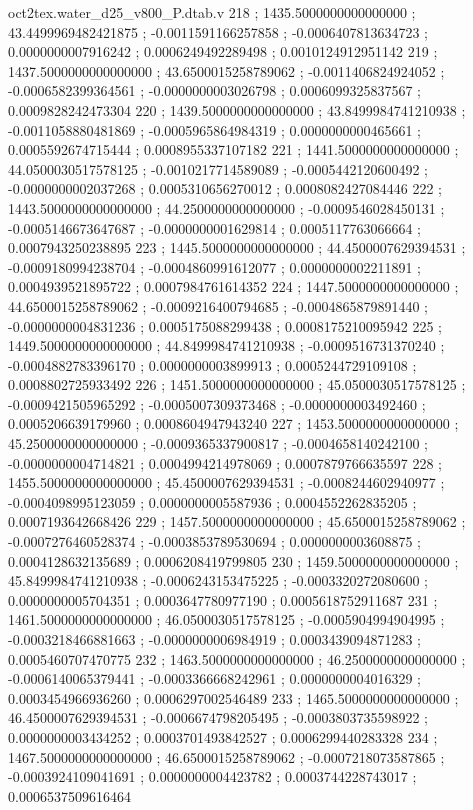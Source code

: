 \begin{filecontents}[overwrite]{oct2tex.water_d25_v800_P.dtab.v}
218 ; 1435.5000000000000000 ; 43.4499969482421875 ; -0.0011591166257858 ; -0.0006407813634723 ; 0.0000000007916242 ; 0.0006249492289498 ; 0.0010124912951142
219 ; 1437.5000000000000000 ; 43.6500015258789062 ; -0.0011406824924052 ; -0.0006582399364561 ; -0.0000000003026798 ; 0.0006099325837567 ; 0.0009828242473304
220 ; 1439.5000000000000000 ; 43.8499984741210938 ; -0.0011058880481869 ; -0.0005965864984319 ; 0.0000000000465661 ; 0.0005592674715444 ; 0.0008955337107182
221 ; 1441.5000000000000000 ; 44.0500030517578125 ; -0.0010217714589089 ; -0.0005442120600492 ; -0.0000000002037268 ; 0.0005310656270012 ; 0.0008082427084446
222 ; 1443.5000000000000000 ; 44.2500000000000000 ; -0.0009546028450131 ; -0.0005146673647687 ; -0.0000000001629814 ; 0.0005117763066664 ; 0.0007943250238895
223 ; 1445.5000000000000000 ; 44.4500007629394531 ; -0.0009180994238704 ; -0.0004860991612077 ; 0.0000000002211891 ; 0.0004939521895722 ; 0.0007984761614352
224 ; 1447.5000000000000000 ; 44.6500015258789062 ; -0.0009216400794685 ; -0.0004865879891440 ; -0.0000000004831236 ; 0.0005175088299438 ; 0.0008175210095942
225 ; 1449.5000000000000000 ; 44.8499984741210938 ; -0.0009516731370240 ; -0.0004882783396170 ; 0.0000000003899913 ; 0.0005244729109108 ; 0.0008802725933492
226 ; 1451.5000000000000000 ; 45.0500030517578125 ; -0.0009421505965292 ; -0.0005007309373468 ; -0.0000000003492460 ; 0.0005206639179960 ; 0.0008604947943240
227 ; 1453.5000000000000000 ; 45.2500000000000000 ; -0.0009365337900817 ; -0.0004658140242100 ; -0.0000000004714821 ; 0.0004994214978069 ; 0.0007879766635597
228 ; 1455.5000000000000000 ; 45.4500007629394531 ; -0.0008244602940977 ; -0.0004098995123059 ; 0.0000000005587936 ; 0.0004552262835205 ; 0.0007193642668426
229 ; 1457.5000000000000000 ; 45.6500015258789062 ; -0.0007276460528374 ; -0.0003853789530694 ; 0.0000000003608875 ; 0.0004128632135689 ; 0.0006208419799805
230 ; 1459.5000000000000000 ; 45.8499984741210938 ; -0.0006243153475225 ; -0.0003320272080600 ; 0.0000000005704351 ; 0.0003647780977190 ; 0.0005618752911687
231 ; 1461.5000000000000000 ; 46.0500030517578125 ; -0.0005904994904995 ; -0.0003218466881663 ; -0.0000000006984919 ; 0.0003439094871283 ; 0.0005460707470775
232 ; 1463.5000000000000000 ; 46.2500000000000000 ; -0.0006140065379441 ; -0.0003366668242961 ; 0.0000000004016329 ; 0.0003454966936260 ; 0.0006297002546489
233 ; 1465.5000000000000000 ; 46.4500007629394531 ; -0.0006674798205495 ; -0.0003803735598922 ; 0.0000000003434252 ; 0.0003701493842527 ; 0.0006299440283328
234 ; 1467.5000000000000000 ; 46.6500015258789062 ; -0.0007218073587865 ; -0.0003924109041691 ; 0.0000000004423782 ; 0.0003744228743017 ; 0.0006537509616464

\end{filecontents}
